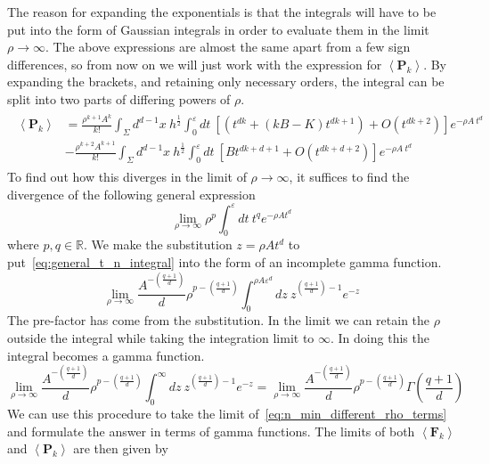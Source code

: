 \documentclass[12pt]{article}
\newcommand{\be}{\begin{equation}}
\newcommand{\ee}{\end{equation}}
\newcommand{\BF}[1]{\mathbf{F}_{#1}}
\newcommand{\BP}[1]{\mathbf{P}_{#1}}
\begin{document}
The reason for expanding the exponentials is that the integrals will have to be put into the form of Gaussian integrals in order to evaluate them in the limit $\rho\rightarrow\infty$. The above expressions are almost the same apart from a few sign differences, so from now on we will just work with the expression for $\left\langle \BP{k}\right\rangle$. By expanding the brackets, and retaining only necessary orders, the integral can be split into two parts of differing powers of $\rho$.
\begin{gather}\label{eq:n_min_different_rho_terms}
\begin{aligned}
\left\langle \BP{k}\right\rangle & = \frac{\rho^{k+1}A^k}{k!}\int_{\Sigma}d^{d-1}x\: h^{\frac{1}{2}}\int_{0}^{\varepsilon}dt\:
\left[ \left ( t^{dk} + \left (kB-K \right)t^{dk+1}\right) + O\left (t^{dk+2}\right) \right] e^{-\rho A\: t^d}
 \\
 & - \frac{\rho^{k+2}A^{k+1}}{k!}\int_{\Sigma}d^{d-1}x\: h^{\frac{1}{2}}\int_{0}^{\varepsilon}dt\:
\left[ Bt^{dk+d+1} + O\left (t^{dk+d+2}\right) \right] e^{-\rho A\: t^d}
\end{aligned}
\end{gather}
To find out how this diverges in the limit of $\rho \rightarrow\infty$, it suffices to find the divergence of the following general expression
\be\label{eq:general_t_n_integral}
\lim_{\rho\rightarrow\infty}\rho^{p}\int_{0}^{\varepsilon}dt\
t^{q}e^{-\rho At^{d}}
\ee
where $p,q \in \mathbb{R}$. We make the substitution $z=\rho At^{d}$ to put~\eqref{eq:general_t_n_integral} into the form of an incomplete gamma function.
\be\label{eq:incomplete_gamma_function}
\lim_{\rho\rightarrow\infty}\frac{A^{-\left (\frac{q+1}{d} \right)}}{d}\rho^{p-\left (\frac{q+1}{d} \right)}\int_{0}^{\rho A \varepsilon^d}dz\
z^{\left (\frac{q+1}{d} \right)-1}e^{-z}
\ee
The pre-factor has come from the substitution. In the limit we can retain the $\rho$ outside the integral while taking the integration limit to $\infty$. In doing this the integral becomes a gamma function.
\be\label{eq:gamma_function}
\lim_{\rho\rightarrow\infty}\frac{A^{-\left (\frac{q+1}{d} \right)}}{d}\rho^{p-\left (\frac{q+1}{d} \right)}\int_{0}^{\infty}dz\
z^{\left (\frac{q+1}{d} \right)-1}e^{-z}=\lim_{\rho\rightarrow\infty}
\frac{A^{-\left (\frac{q+1}{d} \right)}}{d}\rho^{p-\left (\frac{q+1}{d} \right)}\Gamma\left ( \frac{q+1}{d} \right)
\ee
We can use this procedure to take the limit of~\eqref{eq:n_min_different_rho_terms} and formulate the answer in terms of gamma functions. The limits of both $\left\langle \BF{k}\right\rangle$ and $\left\langle \BP{k}\right\rangle$ are then given by
\end{document}
